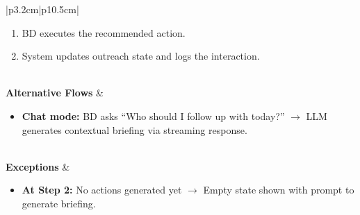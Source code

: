 \documentclass[a4paper]{article}
\begin{document}
\begin{table}[H]
\begin{tabular}{|p{3.2cm}|p{10.5cm}|}
\begin{minipage}[t]{\linewidth}
\begin{enumerate}[nosep,leftmargin=*]
  \item BD executes the recommended action.
  \item System updates outreach state and logs the interaction.
\end{enumerate}
\end{minipage} \\
\hline
\textbf{Alternative Flows} &
\begin{minipage}[t]{\linewidth}
\begin{itemize}[nosep,leftmargin=*]
  \item \textbf{Chat mode:} BD asks ``Who should I follow up with 
  today?'' $\rightarrow$ LLM generates contextual briefing via 
  streaming response.
\end{itemize}
\end{minipage} \\
\hline
\textbf{Exceptions} &
\begin{minipage}[t]{\linewidth}
\begin{itemize}[nosep,leftmargin=*]
  \item \textbf{At Step 2:} No actions generated yet $\rightarrow$ 
  Empty state shown with prompt to generate briefing.
\end{itemize}
\end{minipage} \\
\hline
\end{tabular}
\end{table}
\end{document}
